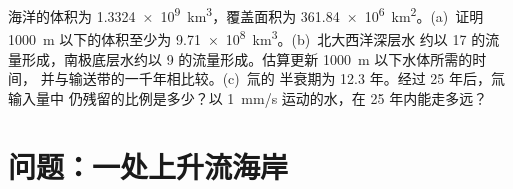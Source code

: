 \begin{exercise}[$\star\star\star$]\label{exo:b1:ocean-circulation:12}
海洋的体积为 \qty{1.3324e9}{km^3}，覆盖面积为 \qty{361.84e6}{km^2}。(a)~证明
\qty{1000}{m} 以下的体积至少为 \qty{9.71e8}{km^3}。(b)~北大西洋深层水
约以 \qty{17}{\sverdrup} 的流量形成，南极底层水约以
\qty{9}{\sverdrup} 的流量形成。估算更新 \qty{1000}{m} 以下水体所需的时间，
并与输送带的一千年相比较。(c)~氚的
半衰期为 12.3 年。经过 25 年后，氚输入量中
仍残留的比例是多少？以 \qty{1}{mm/s} 运动的水，在 25 年内能走多远？
\end{exercise}

\section{问题：一处上升流海岸}

